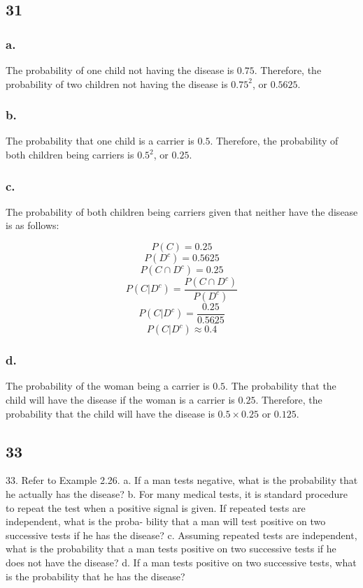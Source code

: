 \documentclass[11pt]{article}
\begin{document}
\subsection{31}
\subsubsection{a.}
The probability of one child not having the disease is $0.75$. Therefore, the
probability of two children not having the disease is $0.75^2$, or $0.5625$. 

\subsubsection{b.}
The probability that one child is a carrier is $0.5$. Therefore, the probability
of both children being carriers is $0.5^2$, or $0.25$. 

\subsubsection{c.}
The probability of both children being carriers given that neither have the
disease is as follows:

\[P(C) = 0.25 \]
\[P(D^c) = 0.5625 \]
\[P(C \cap D^c) = 0.25 \]
\[P(C|D^c) = \frac{P(C \cap D^c)}{P(D^c)} \]
\[P(C|D^c) = \frac{0.25}{0.5625} \]
\[P(C|D^c) \approx 0.\overline{4}  \]

\subsubsection{d.}
The probability of the woman being a carrier is $0.5$. The probability that the
child will have the disease if the woman is a carrier is $0.25$. Therefore, the
probability that the child will have the disease is $0.5 \times 0.25$ or
$0.125$. 

\subsection{33}
33. Refer to Example 2.26.
a. If a man tests negative, what is the probability that
he actually has the disease?
b. For many medical tests, it is standard procedure to
repeat the test when a positive signal is given. If
repeated tests are independent, what is the proba-
bility that a man will test positive on two successive
tests if he has the disease?
c. Assuming repeated tests are independent, what is
the probability that a man tests positive on two
successive tests if he does not have the disease?
d. If a man tests positive on two successive tests, what
is the probability that he has the disease?
\end{document}
